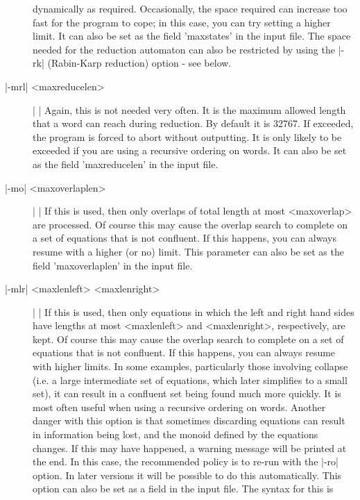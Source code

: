 \begin{description}
dynamically as required. Occasionally, the space required can increase too fast
for the program to cope; in this case, you can try setting a higher limit.
It can also be set as the field 'maxstates' in the input file.
The space needed for the reduction automaton can also be restricted by
using the |-rk| (Rabin-Karp reduction) option - see below.
\item[|-mrl| <maxreducelen>] | |\newline
Again, this is not needed very often. It is the maximum allowed length that
a word can reach during reduction. By default it is 32767.
If exceeded, the program is forced to abort without outputting.
It is only likely to be exceeded if you are using a recursive ordering on words.
It can also be set as the field 'maxreducelen' in the input file.
\item[|-mo| <maxoverlaplen>] | |\newline
If this is used, then only overlaps of total length at most <maxoverlap>
are processed.
Of course this may cause the overlap search to complete on a set
of equations that is not confluent. If this happens, you can always resume
with a higher (or no) limit.
This parameter can also be set as the field 'maxoverlaplen' in the input file.
\item[|-mlr| <maxlenleft> <maxlenright>] | |\newline
If this is used, then only equations in which the left and right hand sides
have lengths at most <maxlenleft> and <maxlenright>, respectively, are
kept. Of course this may cause the overlap search to complete on a set
of equations that is not confluent. If this happens, you can always resume
with higher limits. In some examples, particularly those involving
collapse (i.e. a large intermediate set of equations, which later simplifies
to a small set), it can result in a confluent set being found much more
quickly. It is most often useful when using a recursive ordering on words. 
Another danger with this option is that sometimes discarding equations can
result in information being lost, and the monoid defined by the equations
changes. If this may have happened, a warning message will be printed at
the end. In this case, the recommended policy is to re-run with the 
|-ro| option. In later versions it will be possible to do this automatically.
This option can also be set as a field in the input file.
The syntax for this is


\end{description}
